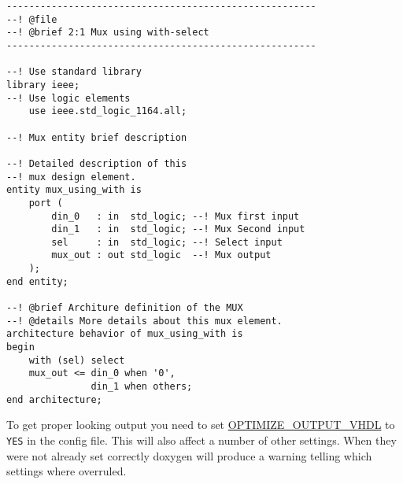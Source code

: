 \begin{DocInclude}\begin{verbatim}-------------------------------------------------------
--! @file
--! @brief 2:1 Mux using with-select
-------------------------------------------------------

--! Use standard library
library ieee;
--! Use logic elements
    use ieee.std_logic_1164.all;

--! Mux entity brief description

--! Detailed description of this 
--! mux design element.
entity mux_using_with is
    port (
        din_0   : in  std_logic; --! Mux first input
        din_1   : in  std_logic; --! Mux Second input
        sel     : in  std_logic; --! Select input
        mux_out : out std_logic  --! Mux output
    );
end entity;

--! @brief Architure definition of the MUX
--! @details More details about this mux element.
architecture behavior of mux_using_with is
begin
    with (sel) select
    mux_out <= din_0 when '0',
               din_1 when others;
end architecture;

\end{verbatim}
\end{DocInclude}
 

To get proper looking output you need to set \hyperlink{config_cfg_optimize_output_vhdl}{OPTIMIZE\_\-OUTPUT\_\-VHDL} to {\tt YES} in the config file. This will also affect a number of other settings. When they were not already set correctly doxygen will produce a warning telling which settings where overruled. 